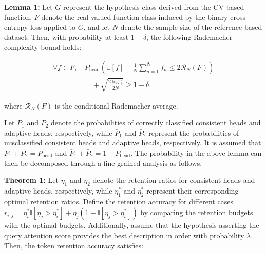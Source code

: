 \textbf{Lemma 1:} Let $G$ represent the hypothesis class derived from the CV-based function, $F$ denote the real-valued function class induced by the binary cross-entropy loss applied to $G$, and let $N$ denote the sample size of the reference-based dataset. Then, with probability at least $1 - \delta$, the following Rademacher complexity bound holds:

\begin{align}
    \forall f \in F, \, &P_{\text{head}}\left( \mathbb{E}[f] - \frac{1}{N} \sum_{n=1}^{N} f_n \leq 2 \mathcal{R}_N(F) \right) \nonumber \\
    &\quad + \sqrt{\frac{2 \log{\frac{2}{\delta}}}{2N}} \geq 1 - \delta.
\end{align}

where $\mathcal{R}_N(F)$ is the conditional Rademacher average.

Let \( P_1 \) and \( P_2 \) denote the probabilities of correctly classified consistent heads and adaptive heads, respectively, while \( \bar{P}_1 \) and \( \bar{P}_2 \) represent the probabilities of misclassified consistent heads and adaptive heads, respectively. It is assumed that \( P_1 + P_2 = P_{\text{head}} \) and \( \bar{P}_1 + \bar{P}_2 = 1 - P_{\text{head}} \). The probability in the above lemma can then be decomposed through a fine-grained analysis as follows.



\textbf{Theorem 1:} Let \( \eta_1 \) and \( \eta_2 \) denote the retention ratios for consistent heads and adaptive heads, respectively, while \( \eta_1^* \) and \( \eta_2^* \) represent their corresponding optimal retention ratios. Define the retention accuracy for different cases $r_{i,j} = \eta_i^* \mathbb{I}[\eta_j > \eta_i^*] + \eta_j (1 - \mathbb{I}[\eta_j > \eta_i^*])$ by comparing the retention budgets with the optimal budgets. Additionally, assume that the hypothesis asserting the query attention score provides the best description in order with probability \( \lambda \). Then, the token retention accuracy satisfies:

